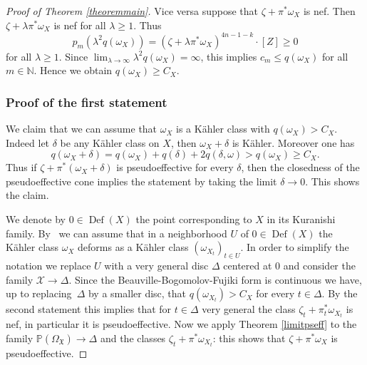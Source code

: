 \documentclass[JEP,XML,SOM,Unicode,NoEqCountersInSection,published]{cedram}
\let\mathcal\mathscr
\theoremstyle{plain}
\theoremstyle{definition}
\newcommand{\N}{\ensuremath{\mathbb{N}}}
\newcommand{\PP}{\ensuremath{\mathbb{P}}}
\DeclareMathOperator{\Def}{Def}
\begin{document}
\begin{proof}[Proof of Theorem \ref{theoremmain}]
Vice versa suppose that $\zeta+\pi^* \omega_X$ is nef. Then $\zeta+ \lambda \pi^* \omega_X$ is nef for all $\lambda \geq 1$.
Thus
\[
p_m(\lambda^2 q(\omega_X)) = (\zeta + \lambda \pi^* \omega_X)^{4n-1-k} \cdot [Z] \geq 0
\]
for all $\lambda \geq 1$. Since $\lim_{\lambda \to \infty} \lambda^2 q(\omega_X) = \infty$, this implies $c_m \leq q(\omega_X)$ for all $m \in \N$. Hence we obtain $q(\omega_X) \geq C_X$.

\subsubsection*{Proof of the first statement}
We claim that we can assume that $\omega_X$ is a Kähler class with $q(\omega_X)>C_X$.
Indeed let $\delta$ be any Kähler class on $X$, then $\omega_X+\delta$ is Kähler. Moreover one has
\[
q(\omega_X+\delta)=q(\omega_X)+q(\delta)+2q(\delta,\omega)>
q(\omega_X) \geq C_X.
\]
Thus if $\zeta+\pi^* (\omega_{X}+\delta)$ is pseudoeffective for every $\delta$, then
the closedness of the pseudoeffective cone implies the statement by
taking the limit $\delta \to 0$. This shows the claim.

We denote by $0\in \Def(X)$ the point corresponding to $X$ in its Kuranishi family. By~\cite[Prop.\,5.6]{Huy16} we can assume that in a neighborhood $U$ of $0\in \Def(X)$ the Kähler class $\omega_X$ deforms as a Kähler class $(\omega_{X_t})_{t \in U}$.
In order to simplify the notation we replace $U$ with a very general disc $\Delta$ centered at $0$ and consider the family $\mathcal{X} \to \Delta$.
Since the Beauville-Bogomolov-Fujiki form is continuous we have, up to replacing~$\Delta$ by a smaller disc, that
$q(\omega_{X_t}) > C_X$ for every $t \in \Delta$.
By the second statement this implies that for $t \in \Delta$ very general the class $\zeta_t + \pi_t^* \omega_{X_t}$ is nef, in particular it is pseudoeffective. Now we apply Theorem \ref{limitpseff} to the family $\PP(\Omega_\mathfrak{X}) \to \Delta$ and the classes $\zeta_{t}+\pi^*\omega_{X_t}$: this shows that $\zeta + \pi^* \omega_{X}$
is pseudoeffective.
\end{proof}
\end{document}
